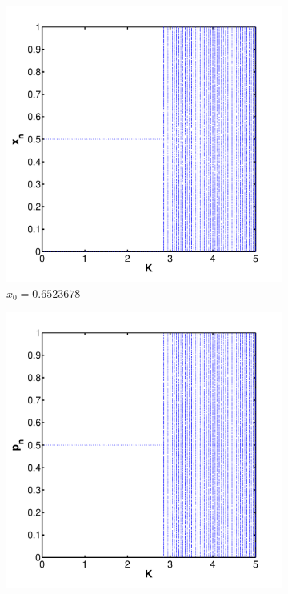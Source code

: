 \begin{figure}[ht]
	\centering
	\begin{subfigure}{0.32\textwidth}
		\centering
			\includegraphics[width=\textwidth]{./img/assignment_b_dim_0_b_x}
			\caption{$x_0 = \num{0.6523678}$}
			\label{fig:experiment:bifurcation:x}
	\end{subfigure}
	\begin{subfigure}{0.32\textwidth}
		\centering
			\includegraphics[width=\textwidth]{./img/assignment_b_dim_0_b_p}

\end{subfigure}
\end{figure}
